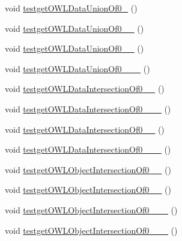 \begin{DoxyCompactItemize}
\item 
void \hyperlink{classorg_1_1semanticweb_1_1owlapi_1_1api_1_1test_1_1_null_check_test_case_aabf65132435ebe0a7809c1729727999c}{testget\-O\-W\-L\-Data\-Union\-Of0\-\_} ()
\item 
void \hyperlink{classorg_1_1semanticweb_1_1owlapi_1_1api_1_1test_1_1_null_check_test_case_a1f0d3091e77470b04a4e2d0f9eb62fff}{testget\-O\-W\-L\-Data\-Union\-Of0\-\_\-\_} ()
\item 
void \hyperlink{classorg_1_1semanticweb_1_1owlapi_1_1api_1_1test_1_1_null_check_test_case_afd5be134d3e7308f25562a228e59d7de}{testget\-O\-W\-L\-Data\-Union\-Of0\-\_\-\_} ()
\item 
void \hyperlink{classorg_1_1semanticweb_1_1owlapi_1_1api_1_1test_1_1_null_check_test_case_a0b53d63480ab15edb4b00881c2776ed7}{testget\-O\-W\-L\-Data\-Union\-Of0\-\_\-\_\-\_} ()
\item 
void \hyperlink{classorg_1_1semanticweb_1_1owlapi_1_1api_1_1test_1_1_null_check_test_case_a9150e2897ee8af53d09fd58bd5663a00}{testget\-O\-W\-L\-Data\-Intersection\-Of0\-\_\-\_} ()
\item 
void \hyperlink{classorg_1_1semanticweb_1_1owlapi_1_1api_1_1test_1_1_null_check_test_case_a9ed67f234ff302ffd2e662fc780b956d}{testget\-O\-W\-L\-Data\-Intersection\-Of0\-\_\-\_\-\_} ()
\item 
void \hyperlink{classorg_1_1semanticweb_1_1owlapi_1_1api_1_1test_1_1_null_check_test_case_a302320fca97a9de2477540ee8d983115}{testget\-O\-W\-L\-Data\-Intersection\-Of0\-\_\-\_} ()
\item 
void \hyperlink{classorg_1_1semanticweb_1_1owlapi_1_1api_1_1test_1_1_null_check_test_case_adf39a30d6e9885e38da2d2bf3d8b3073}{testget\-O\-W\-L\-Data\-Intersection\-Of0\-\_\-\_\-\_} ()
\item 
void \hyperlink{classorg_1_1semanticweb_1_1owlapi_1_1api_1_1test_1_1_null_check_test_case_aaee160e9f7c331bfdb7e689581807632}{testget\-O\-W\-L\-Object\-Intersection\-Of0\-\_\-\_} ()
\item 
void \hyperlink{classorg_1_1semanticweb_1_1owlapi_1_1api_1_1test_1_1_null_check_test_case_a13bdcc7fe216d2aaa265cfc8781a5fce}{testget\-O\-W\-L\-Object\-Intersection\-Of0\-\_\-\_} ()
\item 
void \hyperlink{classorg_1_1semanticweb_1_1owlapi_1_1api_1_1test_1_1_null_check_test_case_a7e1c0917930b05c41ca21090273e8846}{testget\-O\-W\-L\-Object\-Intersection\-Of0\-\_\-\_\-\_} ()
\item 
void \hyperlink{classorg_1_1semanticweb_1_1owlapi_1_1api_1_1test_1_1_null_check_test_case_a851ec345f33dbf5bcf3d0c280567c150}{testget\-O\-W\-L\-Object\-Intersection\-Of0\-\_\-\_\-\_} ()

\end{DoxyCompactItemize}
